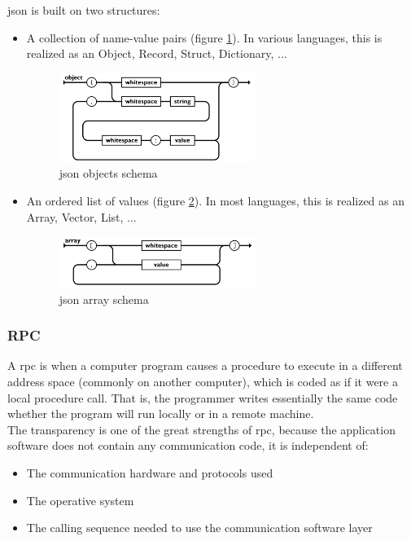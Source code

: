 \acrshort{json} is built on two structures\cite{jsonSchema}:
\begin{itemize}
    \item A collection of name-value pairs (figure \ref{fig:json_objects}). In various languages, this is realized as an Object, Record, Struct, Dictionary, ...
          \begin{figure}[h]
              \centering
              \includegraphics[width=0.6\textwidth]{images/State of the Art/json-rpc/json-objects.png}
              \caption{\acrshort{json} objects schema}
              \label{fig:json_objects}
          \end{figure}
    \item An ordered list of values (figure \ref{fig:json_arrays}). In most languages, this is realized as an Array, Vector, List, ...
          \begin{figure}[h]
              \centering
              \includegraphics[width=0.6\textwidth]{images/State of the Art/json-rpc/json-arrays.png}
              \caption{\acrshort{json} array schema}
              \label{fig:json_arrays}
          \end{figure}
\end{itemize}

\subsubsection{RPC}
A \acrfull{rpc}\cite{rpc} is when a computer program causes a procedure to execute in a different address space (commonly on another computer), which is coded as if it were a local procedure call. That is, the programmer writes essentially the same code whether the program will run locally or in a remote machine.\\

The transparency is one of the great strengths of \acrshort{rpc}, because the application software does not contain any communication code, it is independent of:
\begin{itemize}
    \item The communication hardware and protocols used
    \item The operative system
    \item The calling sequence needed to use the communication software layer
\end{itemize}

